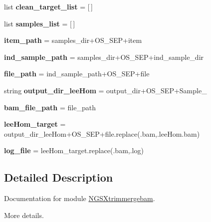 \begin{DoxyCompactItemize}
\item 
list {\bfseries clean\+\_\+target\+\_\+list} = \mbox{[}$\,$\mbox{]}\hypertarget{namespaceNGSXtrimmergebam_ac2ee478884afc288e430328c6da11c79}{}\label{namespaceNGSXtrimmergebam_ac2ee478884afc288e430328c6da11c79}

\item 
list {\bfseries samples\+\_\+list} = \mbox{[}$\,$\mbox{]}\hypertarget{namespaceNGSXtrimmergebam_a46de7e064fe3a75d02c3c91684491bc7}{}\label{namespaceNGSXtrimmergebam_a46de7e064fe3a75d02c3c91684491bc7}

\item 
{\bfseries item\+\_\+path} = samples\+\_\+dir+O\+S\+\_\+\+S\+EP+item\hypertarget{namespaceNGSXtrimmergebam_aa8b35ccf47ecaeefb6cb111251e610bf}{}\label{namespaceNGSXtrimmergebam_aa8b35ccf47ecaeefb6cb111251e610bf}

\item 
{\bfseries ind\+\_\+sample\+\_\+path} = samples\+\_\+dir+O\+S\+\_\+\+S\+EP+ind\+\_\+sample\+\_\+dir\hypertarget{namespaceNGSXtrimmergebam_aa054e1211e1ee4f6dd31378fb137e14c}{}\label{namespaceNGSXtrimmergebam_aa054e1211e1ee4f6dd31378fb137e14c}

\item 
{\bfseries file\+\_\+path} = ind\+\_\+sample\+\_\+path+O\+S\+\_\+\+S\+EP+file\hypertarget{namespaceNGSXtrimmergebam_ad5e0353441dcfa86226085c798c7fdd8}{}\label{namespaceNGSXtrimmergebam_ad5e0353441dcfa86226085c798c7fdd8}

\item 
string {\bfseries output\+\_\+dir\+\_\+lee\+Hom} = output\+\_\+dir+O\+S\+\_\+\+S\+EP+\textquotesingle{}Sample\+\_\+\textquotesingle{}\hypertarget{namespaceNGSXtrimmergebam_a7b0bfada7ceae09af115d447cc53eebb}{}\label{namespaceNGSXtrimmergebam_a7b0bfada7ceae09af115d447cc53eebb}

\item 
{\bfseries bam\+\_\+file\+\_\+path} = file\+\_\+path\hypertarget{namespaceNGSXtrimmergebam_a2fa88db033925de245e65cae1ef082a3}{}\label{namespaceNGSXtrimmergebam_a2fa88db033925de245e65cae1ef082a3}

\item 
{\bfseries lee\+Hom\+\_\+target} = output\+\_\+dir\+\_\+lee\+Hom+O\+S\+\_\+\+S\+EP+file.\+replace(\textquotesingle{}.bam\textquotesingle{},\textquotesingle{}.lee\+Hom.\+bam\textquotesingle{})\hypertarget{namespaceNGSXtrimmergebam_af236f7ee584e8dc12770de74c1be36e7}{}\label{namespaceNGSXtrimmergebam_af236f7ee584e8dc12770de74c1be36e7}

\item 
{\bfseries log\+\_\+file} = lee\+Hom\+\_\+target.\+replace(\textquotesingle{}.bam\textquotesingle{},\textquotesingle{}.log\textquotesingle{})\hypertarget{namespaceNGSXtrimmergebam_ada7ab0afa7f42df42764ab8ec926d366}{}\label{namespaceNGSXtrimmergebam_ada7ab0afa7f42df42764ab8ec926d366}

\end{DoxyCompactItemize}


\subsection{Detailed Description}
Documentation for module \hyperlink{namespaceNGSXtrimmergebam}{N\+G\+S\+Xtrimmergebam}. 

More details. 